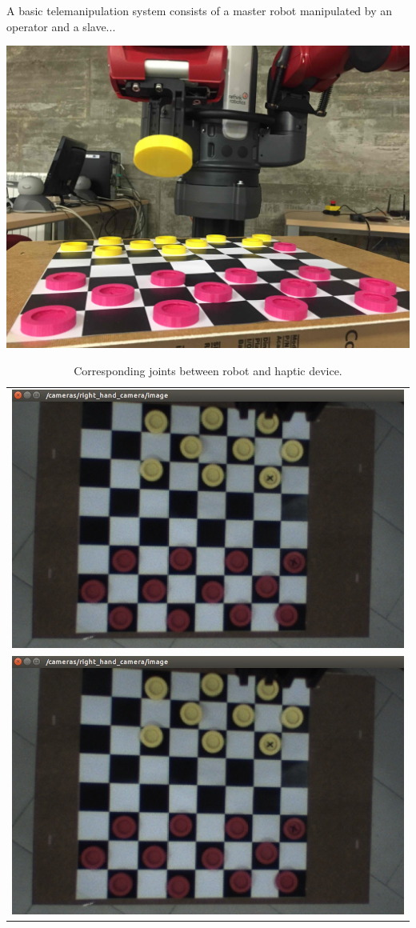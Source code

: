 \documentclass[journal,twoside]{JoPhA}
\begin{document}
  A basic telemanipulation system consists of a master robot manipulated by an operator and a slave...
  
\includegraphics[scale=0.07]{Images/baxterHoldingPiece.jpg} 


\begin{table}
\centering
\begin{tabular}{c}
\includegraphics[scale=0.25]{Images/baxterCamaraBrazo.jpg} \\
\includegraphics[scale=0.25]{Images/baxterCamaraBrazo.jpg} 
\end{tabular}
\caption{\label{tabla_joints} Corresponding joints between robot and haptic device.}
\end{table}
\end{document}
